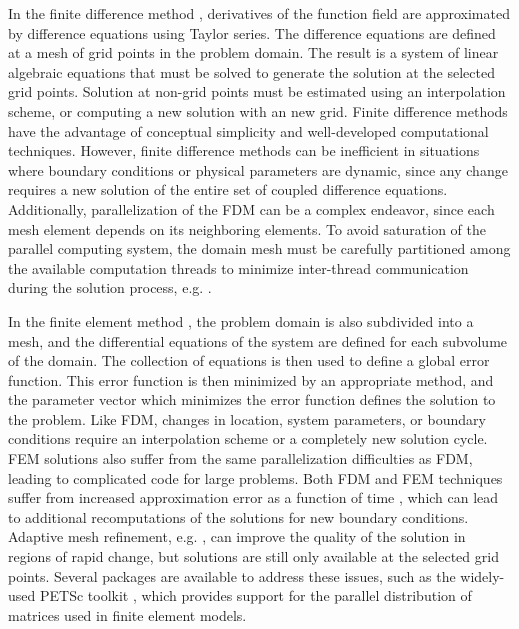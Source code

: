 \documentclass{article}
\begin{document}
In the finite difference method \cite{Heath2002}, derivatives of the function field are approximated by difference equations using Taylor series. The difference equations are defined at a mesh of grid points in the problem domain. The result is a system of linear algebraic equations that must be solved to generate the solution at the selected grid points. Solution at non-grid points must be estimated using an interpolation scheme, or computing a new solution with an new grid. Finite difference methods have the advantage of conceptual simplicity and well-developed computational techniques. However, finite difference methods can be inefficient in situations where boundary conditions or physical parameters are dynamic, since any change requires a new solution of the entire set of coupled difference equations. Additionally, parallelization of the FDM can be a complex endeavor, since each mesh element depends on its neighboring elements. To avoid saturation of the parallel computing system, the domain mesh must be carefully partitioned among the available computation threads to minimize inter-thread communication during the solution process, e.g. \cite{Schreiber2017}.

In the finite element method \cite{DeVries2011}, the problem domain is also subdivided into a mesh, and the differential equations of the system are defined for each subvolume of the domain. The collection of equations is then used to define a global error function. This error function is then minimized by an appropriate method, and the parameter vector which minimizes the error function defines the solution to the problem. Like FDM, changes in location, system parameters, or boundary conditions require an interpolation scheme or a completely new solution cycle. FEM solutions also suffer from the same parallelization difficulties as FDM, leading to complicated code for large problems. Both FDM and FEM techniques suffer from increased approximation error as a function of time \cite{Carnahan1969}, which can lead to additional recomputations of the solutions for new boundary conditions. Adaptive mesh refinement, e.g. \cite{Berger1989}, can improve the quality of the solution in regions of rapid change, but solutions are still only available at the selected grid points. Several packages are available to address these issues, such as the widely-used PETSc toolkit \cite{petsc}, which provides support for the parallel distribution of matrices used in finite element models.
\end{document}
